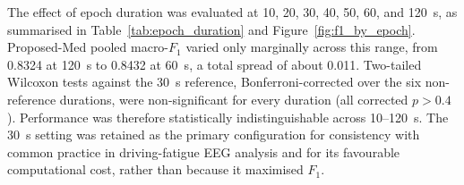 The effect of epoch duration was evaluated at 10, 20, 30, 40, 50, 60, and 120~s, as summarised in Table~\ref{tab:epoch_duration} and Figure~\ref{fig:f1_by_epoch}. Proposed-Med pooled macro-$F_1$ varied only marginally across this range, from 0.8324 at 120~s to 0.8432 at 60~s, a total spread of about 0.011. Two-tailed Wilcoxon tests against the 30~s reference, Bonferroni-corrected over the six non-reference durations, were non-significant for every duration (all corrected $p>0.4$). Performance was therefore statistically indistinguishable across 10--120~s. The 30~s setting was retained as the primary configuration for consistency with common practice in driving-fatigue EEG analysis and for its favourable computational cost, rather than because it maximised $F_1$.
